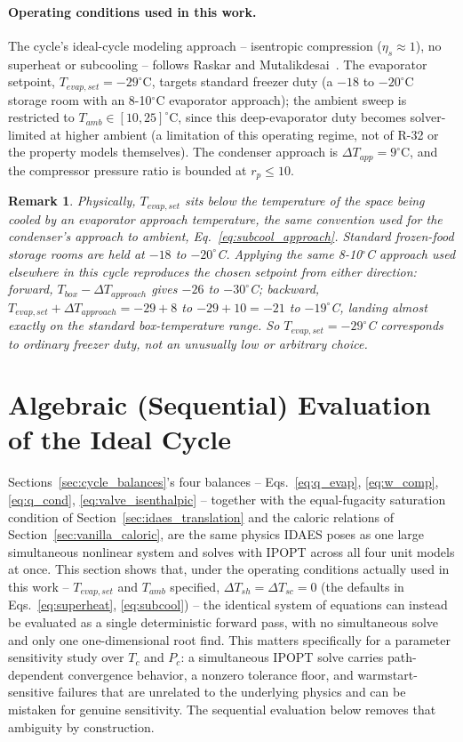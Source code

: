 \documentclass{article}
\newtheorem{remark}{Remark}
\begin{document}
\paragraph{Operating conditions used in this work.} The cycle's ideal-cycle
modeling approach -- isentropic compression ($\eta_s\approx1$), no superheat or subcooling -- follows Raskar and Mutalikdesai~\cite{raskarmutalikdesai2016}. The evaporator setpoint, $T_{evap,set}=-29^\circ$C, targets standard freezer duty (a $-18$ to
$-20^\circ$C storage room with an 8-10$^\circ$C evaporator approach); the ambient sweep is restricted to $T_{amb}\in[10,25]^\circ$C, since this deep-evaporator duty becomes solver-limited at higher ambient (a limitation of this operating regime, not of R-32 or the property models themselves). The condenser approach is $\Delta T_{app}=9^\circ$C, and the compressor pressure ratio is bounded at $r_p\le10$.

\begin{remark}
Physically, $T_{evap,set}$ sits below the temperature of the space being cooled by an evaporator approach temperature, the same convention used for the condenser's approach to ambient, Eq.~\eqref{eq:subcool_approach}.
Standard frozen-food storage rooms are held at $-18$ to $-20^\circ$C. Applying the same 8-10$^\circ$C approach used elsewhere in this cycle reproduces the chosen setpoint from either direction: forward, $T_{box} -
\Delta T_{approach}$ gives $-26$ to $-30^\circ$C; backward, $T_{evap,set} +
\Delta T_{approach} = -29 + 8$ to $-29 + 10 = -21$ to $-19^\circ$C, landing almost exactly on the standard box-temperature range. So
$T_{evap,set}=-29^\circ$C corresponds to ordinary freezer duty, not an unusually low or arbitrary choice.
\end{remark}

\section{Algebraic (Sequential) Evaluation of the Ideal Cycle}\label{sec:algebraic_cycle}

Sections~\ref{sec:cycle_balances}'s four balances -- Eqs.~\eqref{eq:q_evap},
\eqref{eq:w_comp}, \eqref{eq:q_cond}, \eqref{eq:valve_isenthalpic} -- together
with the equal-fugacity saturation condition of
Section~\ref{sec:idaes_translation} and the caloric relations of
Section~\ref{sec:vanilla_caloric}, are the same physics IDAES poses as one
large simultaneous nonlinear system and solves with IPOPT across all four
unit models at once. This section shows that, under the operating
conditions actually used in this work -- $T_{evap,set}$ and $T_{amb}$
specified, $\Delta T_{sh}=\Delta T_{sc}=0$ (the defaults in
Eqs.~\eqref{eq:superheat}, \eqref{eq:subcool}) -- the identical system of
equations can instead be evaluated as a single deterministic forward pass,
with no simultaneous solve and only one one-dimensional root find. This
matters specifically for a parameter sensitivity study over $T_c$ and
$P_c$: a simultaneous IPOPT solve carries path-dependent convergence
behavior, a nonzero tolerance floor, and warmstart-sensitive failures that
are unrelated to the underlying physics and can be mistaken for genuine
sensitivity. The sequential evaluation below removes that ambiguity by
construction.
\end{document}
